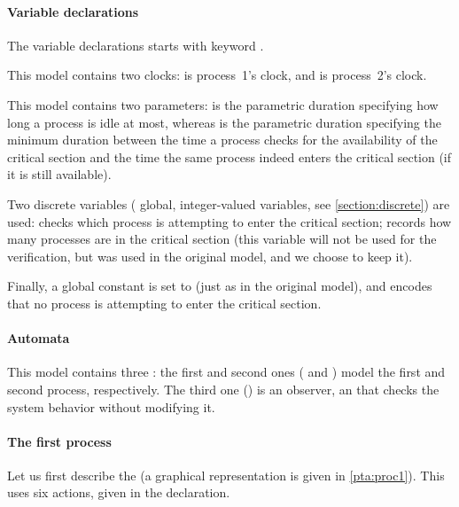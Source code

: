 \paragraph{Variable declarations}
The variable declarations starts with keyword .

This model contains two clocks:  is process~1's clock, and  is process~2's clock.

This model contains two parameters:  is the parametric duration specifying how long a process is idle at most, whereas  is the parametric duration specifying the minimum duration between the time a process checks for the availability of the critical section and the time the same process indeed enters the critical section (if it is still available).

Two discrete variables (\ie{} global, integer-valued variables, see \cref{section:discrete}) are used:
	 checks which process is attempting to enter the critical section;
	 records how many processes are in the critical section (this variable will not be used for the verification, but was used in the original \pat{} model, and we choose to keep it).

Finally, a global constant  is set to  (just as in the original \pat{} model), and encodes that no process is attempting to enter the critical section.





\paragraph{Automata}
This model contains three \IPTA{}:
the first and second ones ( and ) model the first and second process, respectively. The third one () is an observer, \ie{} an \IPTA{} that checks the system behavior without modifying it.

\paragraph{The first process}
Let us first describe the \IPTA{}  (a graphical representation is given in \cref{pta:proc1}).
This \IPTA{} uses six actions, given in the  declaration.

